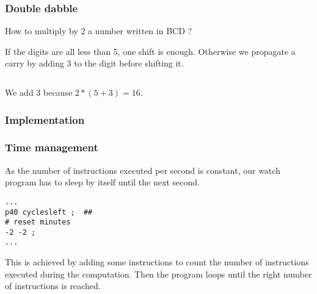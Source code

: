\documentclass{beamer}
\begin{document}
\begin{frame}
    \frametitle{Double dabble}

    How to multiply by 2 a number written in BCD ?

    If the digits are all less than 5, one shift is enough.
    Otherwise we propagate a carry by adding 3 to the digit before shifting it.

    \begin{columns}[t]
        \begin{column}[T]{5cm}
            \vspace{1cm}
        \end{column}
        \begin{column}[T]{5cm}
            \vspace{1cm}

        \end{column}
    \end{columns}

    We add 3 because $2*(5 + 3) = 16$.
\end{frame}

\begin{frame}
  \frametitle{Implementation}

  

\end{frame}


\begin{frame}[fragile]
    \frametitle{Time management}

    As the number of instructions executed per second is constant, our watch program has to sleep by itself until
    the next second.

    \begin{verbatim}
...
p40 cyclesleft ;  ##
# reset minutes
-2 -2 ;
...
    \end{verbatim}

    This is achieved by adding some instructions to count the number of instructions executed during the computation.
    Then the program loops until the right number of instructions is reached.
\end{frame}
\end{document}

